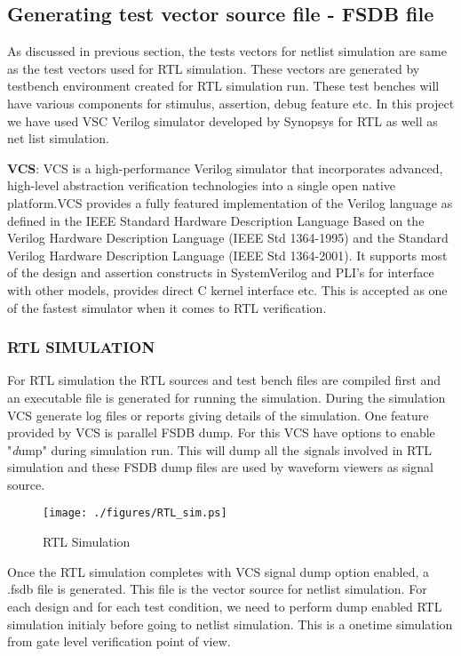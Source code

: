 \subsection{Generating test vector source file - FSDB file}
As discussed in previous section, the tests vectors for netlist simulation are same as the test vectors used for RTL simulation. These vectors are generated by testbench environment created for RTL simulation run. These test benches will have various components for stimulus, assertion, debug feature etc. In this project we have used VSC Verilog simulator developed by Synopsys for RTL as well as net list simulation. 

{\bf VCS}: VCS is a high-performance Verilog simulator that  incorporates advanced, high-level abstraction verification  technologies into a single open native platform.VCS provides a fully featured implementation of the Verilog language as defined in the IEEE Standard Hardware Description Language Based on the Verilog Hardware Description Language (IEEE Std 1364-1995) and the Standard Verilog Hardware Description Language (IEEE Std 1364-2001). It supports most of the design and assertion constructs in SystemVerilog and PLI's for interface with other models, provides direct C kernel interface etc.  This is accepted as one of the fastest simulator when it comes to RTL verification. 

\subsubsection{RTL SIMULATION}

For RTL simulation the RTL sources and test bench files are compiled first and an executable file is generated for running the simulation. During the simulation VCS generate log files or reports giving details of the simulation. One feature provided by VCS is parallel FSDB dump. For this VCS have options to enable "{\emph dump}" during simulation run. This will dump all the {\emph signals} involved in RTL simulation and these FSDB dump files are used by waveform viewers as signal source.

\begin{figure}[h]
\centering
\texttt{[image: ./figures/RTL\_sim.ps]}
\caption{RTL Simulation}
\label{fig:RTL_sim.eps}
\end{figure}



Once the RTL simulation completes with VCS signal dump option enabled, a .fsdb file is generated. This file is the vector source for netlist simulation. For each design and for each test condition, we need to perform dump enabled RTL simulation initialy before going to netlist simulation. This is a onetime simulation from gate level verification point of view.


